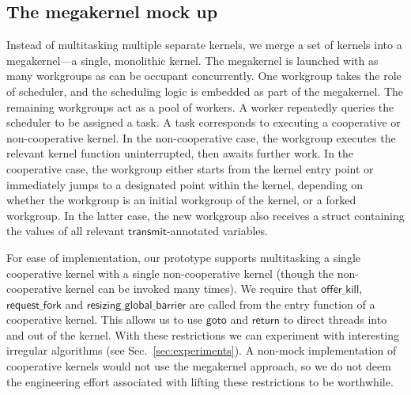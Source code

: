 \documentclass[parskip=half,sigconf,review, anonymous=true, acmcopyrightmode=none]{acmart}
\newcommand{\kernelmerge}{\textsc{KernelMerge}}
\newcommand{\mysec}{Sec.~}
\newcommand{\transmit}{\mathsf{transmit}}
\newcommand{\offerfork}{\mathsf{request\_fork}}
\newcommand{\offerkill}{\mathsf{offer\_kill}}
\newcommand{\resizingglobalbarrier}{\mathsf{resizing\_global\_barrier}}
\newcommand{\keyword}[1]{\mathsf{#1}}
\begin{document}
\subsection{The megakernel mock up}\label{sec:megakernel}

Instead of multitasking multiple separate kernels, we merge a set of
kernels into a megakernel---a single, monolithic kernel.  The
megakernel is launched with as many workgroups as can be occupant
concurrently.  One workgroup takes the role of scheduler, and the
scheduling logic is embedded as part of the megakernel.  The remaining
workgroups act as a pool of workers.  A worker repeatedly queries the
scheduler to be assigned a task.  A task corresponds to executing a
cooperative or non-cooperative kernel.  In the non-cooperative case,
the workgroup executes the relevant kernel function uninterrupted,
then awaits further work.  In the cooperative case, the workgroup
either starts from the kernel entry point or immediately jumps to a
designated point within the kernel, depending on whether the workgroup
is an initial workgroup of the kernel, or a forked workgroup.  In the
latter case, the new workgroup also receives a struct containing the
values of all relevant $\transmit$-annotated variables.

%
For ease of implementation, our prototype supports multitasking a
single cooperative kernel with a single non-cooperative kernel (though
the non-cooperative kernel can be invoked many times).
We require that $\offerkill$, $\offerfork$ and
$\resizingglobalbarrier$ are called from the entry function of a
cooperative kernel.  This allows us to use $\keyword{goto}$ and
$\keyword{return}$ to direct threads into and out of the kernel.  With
these restrictions we can experiment with interesting irregular
algorithms (see \mysec\ref{sec:experiments}).  A non-mock
implementation of cooperative kernels would not use the megakernel
approach, so we do not deem the engineering effort associated with
lifting these restrictions to be worthwhile.

%
\end{document}

